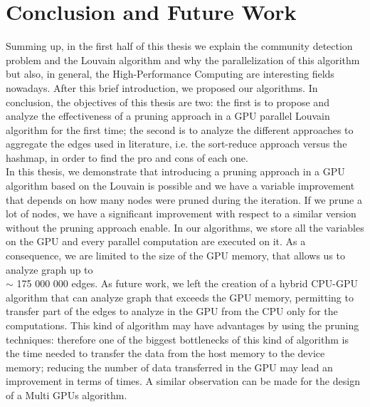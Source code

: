 \section{Conclusion and Future Work}\label{c8}
Summing up, in the first half of this thesis we explain the community detection problem and the Louvain algorithm and why the parallelization of this algorithm but also, in general, the High-Performance Computing are interesting fields nowadays. After this brief introduction, we proposed our algorithms.
In conclusion, the objectives of this thesis are two: the first is to propose and analyze the effectiveness of a pruning approach in a GPU parallel Louvain algorithm for the first time; the second is to analyze the different approaches to aggregate the edges used in literature, i.e. the sort-reduce approach versus the hashmap, in order to find the pro and cons of each one. \\
In this thesis, we demonstrate that introducing a pruning approach in a GPU algorithm based on the Louvain is possible and we have a variable improvement that depends on how many nodes were pruned during the iteration. If we prune a lot of nodes, we have a  significant improvement with respect to a similar version without the pruning approach enable. In our algorithms, we store all the variables on the GPU and every parallel computation are executed on it. As a consequence, we are limited to the size of the GPU memory, that allows us to analyze graph up to \\$\sim$ 175 000 000 edges. As future work, we left the creation of a hybrid CPU-GPU algorithm that can analyze graph that exceeds the GPU memory, permitting to transfer part of the edges to analyze in the GPU from the CPU only for the computations. This kind of algorithm may have advantages by using the pruning techniques: therefore one of the biggest bottlenecks of this kind of algorithm is the time needed to transfer the data from the host memory to the device memory; reducing the number of data transferred in the GPU may lead an improvement in terms of times. A similar observation can be made for the design of a Multi GPUs algorithm. \\
